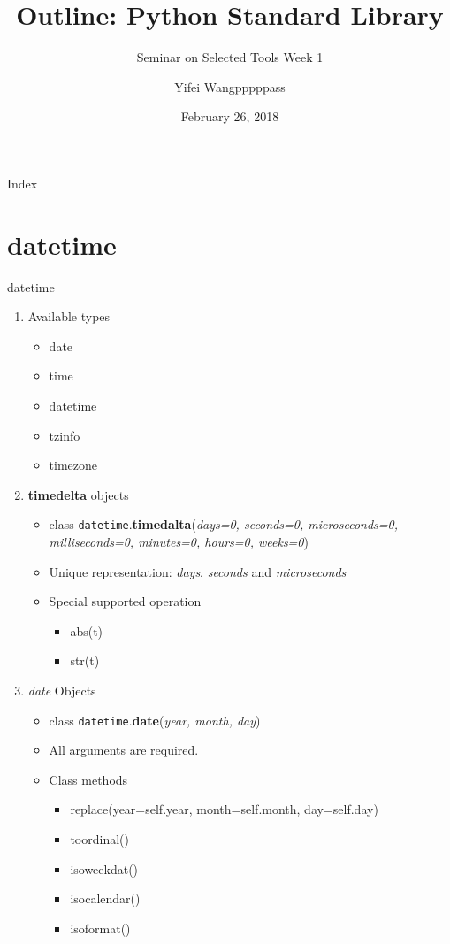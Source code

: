 \documentclass[xcolor=table]{mysld}
\title{Outline: Python Standard Library}
\subtitle{Seminar on Selected Tools Week 1}
\author{Yifei Wang\quad pppppass}
\date{February 26, 2018}
\begin{document}
\begin{frame}
\titlepage
\end{frame}

\begin{frame}{Index}
\tableofcontents
\end{frame}

\section{datetime}
\begin{frame}[allowframebreaks]{datetime}
\begin{enumerate}
\item Available types
\begin{itemize}
\item date
\item time
\item datetime
\item tzinfo
\item timezone
\end{itemize}
\item \textbf{timedelta} objects
\begin{itemize}
\item class \texttt{datetime}.\textbf{timedalta}(\textit{days=0, seconds=0, microseconds=0, milliseconds=0, minutes=0, hours=0, weeks=0}) 
\item Unique representation: \textit{days}, \textit{seconds} and \textit{microseconds}
\item Special supported operation
\begin{itemize}
\item abs(t)
\item str(t)
\end{itemize}
\end{itemize}
\framebreak
\item \textit{date} Objects
\begin{itemize}
\item class \texttt{datetime}.\textbf{date}(\textit{year, month, day})
\item All arguments are required. 
\item Class methods
\begin{itemize}
\item replace(year=self.year, month=self.month, day=self.day)
\item toordinal()
\item isoweekdat()
\item isocalendar()
\item isoformat()

\end{itemize}
\end{itemize}
\end{enumerate}
\end{frame}
\end{document}
